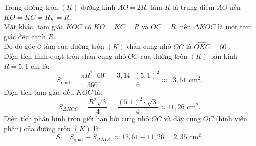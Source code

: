 \begin{bt}
{\begin{enumerate}[a)]
	Trong đường tròn $(K)$ đường kính $AO = 2R$, tâm $K$ là trung điểm $AO$ nên $KO = KC = R_K = R$.\\
	Mặt khác, tam giác $KOC$ có $KO = KC = R$ và $OC = R$, nên $\Delta KOC$ là một tam giác đều cạnh $R$.\\
	Do đó góc ở tâm của đường tròn $(K)$ chắn cung nhỏ $OC$ là $\widehat{OKC} = 60^\circ$.\\
	Diện tích hình quạt tròn chắn cung nhỏ $OC$ của đường tròn $(K)$ bán kính $R = 5{,}1\text{ cm}$ là:
	$$ S_{\text{quạt}} = \dfrac{\pi R^2 \cdot 60^\circ}{360^\circ} = \dfrac{3{,}14 \cdot (5{,}1)^2}{6} \approx 13{,}61\text{ cm}^2. $$
	Diện tích tam giác đều $KOC$ là:
	$$ S_{\Delta KOC} = \dfrac{R^2\sqrt{3}}{4} = \dfrac{(5{,}1)^2 \cdot \sqrt{3}}{4} \approx 11{,}26\text{ cm}^2. $$
	Diện tích phần hình tròn giới hạn bởi cung nhỏ $OC$ và dây cung $OC$ (hình viên phân) của đường tròn $(K)$ là:
	$$ S = S_{\text{quạt}} - S_{\Delta KOC} \approx 13{,}61 - 11{,}26 = 2{,}35\text{ cm}^2. $$
\end{enumerate}
}
\end{bt}

